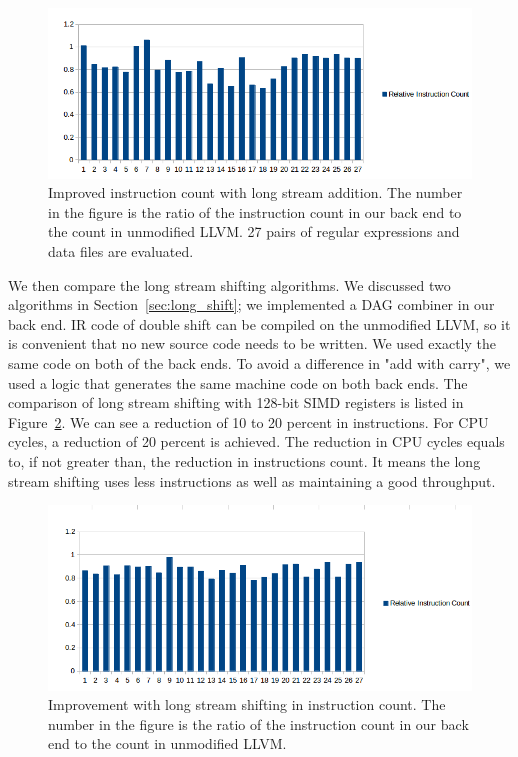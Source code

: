 \begin{figure}[htbp!]
\centering
\includegraphics[width=140mm]{draw/inst_count_long_add.png}
\caption[Improvement with long stream addition and the new intrinsic in instruction count]{Improved instruction count with long stream addition. The number in the figure is the ratio of the instruction count in our back end to the count in unmodified LLVM. 27 pairs of regular expressions and data files are evaluated.}
\label{fig:inst_count_long_add}
\end{figure}

We then compare the long stream shifting algorithms. We discussed two algorithms in Section~\ref{sec:long_shift}; we implemented a DAG combiner in our back end. IR code of double shift can be compiled on the unmodified LLVM, so it is convenient that no new source code needs to be written. We used exactly the same code on both of the back ends. To avoid a difference in "add with carry", we used a logic that generates the same machine code on both back ends. The comparison of long stream shifting with 128-bit SIMD registers is listed in Figure~\ref{fig:inst_count_long_shift}. We can see a reduction of 10 to 20 percent in instructions. For CPU cycles, a reduction of 20 percent is achieved. The reduction in CPU cycles equals to, if not greater than, the reduction in instructions count. It means the long stream shifting uses less instructions as well as maintaining a good throughput.

\begin{figure}[htbp!]
\centering
\includegraphics[width=140mm]{draw/inst_count_long_shift.png}
\caption[Improvement with long stream shifting in instruction count]{Improvement with long stream shifting in instruction count. The number in the figure is the ratio of the instruction count in our back end to the count in unmodified LLVM.}
\label{fig:inst_count_long_shift}
\end{figure}

